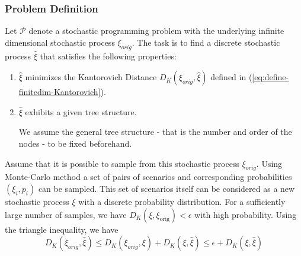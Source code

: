 \subsubsection{Problem Definition}
Let $\mathcal{P}$ denote a stochastic programming problem with the underlying infinite dimensional stochastic process $\xi_{orig}$.
The task is to find a discrete stochastic process $\hat{\xi}$ that satisfies the following properties:
\begin{enumerate}
\item $\hat{\xi}$ minimizes the Kantorovich Distance $D_K(\xi_{orig},\hat{\xi})$ defined in (\ref{eq:define-finitedim-Kantorovich}).
\item $\hat{\xi}$ exhibits a given tree structure.
\begin{comment}
  (see figure \ref{fig:generic-tree-structure}
\end{comment}
We assume the general tree structure - that is the number and order of the nodes - to be fixed beforehand. 
\end{enumerate}
Assume that it is possible to sample from this stochastic process $\xi_{orig}$.
Using Monte-Carlo method a set of pairs of scenarios and corresponding probabilities $(\xi_i,p_i)$ can be sampled.
This set of scenarios itself can be considered as a new stochastic process $\xi$ with a discrete probability distribution.
For a sufficiently large number of samples, we have $D_K(\xi,\xi_{\mathrm{orig}})<\epsilon$ with high probability.
Using the triangle inequality, we have
\begin{equation}
  \label{eq:triangle-montecarlo-kantoro}
  D_K(\xi_{orig},\hat{\xi}) \leq D_K(\xi_{orig},\xi) + D_K(\xi, \hat{\xi}) \leq \epsilon + D_K(\xi, \hat{\xi})
\end{equation}

